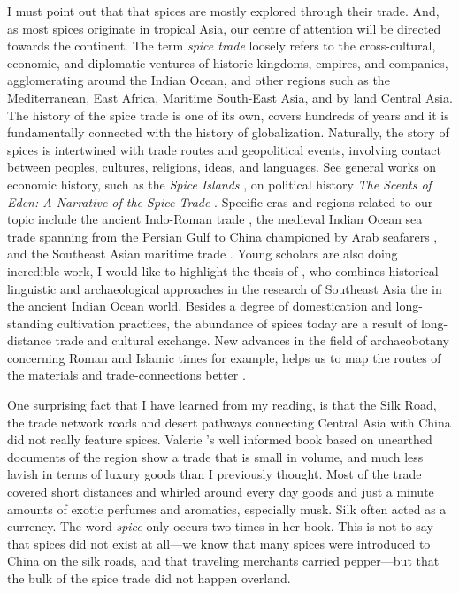 I must point out that that spices are mostly explored through their trade. And, as most spices originate in tropical Asia, our centre of attention will be directed towards the continent. The term \textit{spice trade} loosely refers to the cross-cultural, economic, and diplomatic ventures of historic kingdoms, empires, and companies, agglomerating around the Indian Ocean, and other regions such as the Mediterranean, East Africa, Maritime South-East Asia, and by land Central Asia. The history of the spice trade is one of its own, covers hundreds of years and it is fundamentally connected with the history of globalization. Naturally, the story of spices is intertwined with trade routes and geopolitical events, involving contact between peoples, cultures, religions, ideas, and languages. See general works on economic history, such as the \textit{Spice Islands} \autocite{burnet_spice_2011}, on political history \textit{The Scents of Eden: A Narrative of the Spice Trade} \autocite{corn_scents_1998}. Specific eras and regions related to our topic include the ancient Indo-Roman trade \autocite{sidebotham_berenike_2011,cobb_indian_2019}, the medieval Indian Ocean sea trade spanning from the Persian Gulf to China championed by Arab seafarers \autocite{hourani_arab_1975, pearson_spices_1996}, and the Southeast Asian maritime trade \autocite{donkin_between_2003,hall_history_2010,reid_southeast_1988}. Young scholars are also doing incredible work, I would like to highlight the thesis of \textcite{hoogervorst_southeast_2012}, who combines historical linguistic and archaeological approaches in the research of Southeast Asia the in the ancient Indian Ocean world. Besides a degree of domestication and long-standing cultivation practices, the abundance of spices today are a result of long-distance trade and cultural exchange. New advances in the field of archaeobotany concerning Roman and Islamic times for example, helps us to map the routes of the materials and trade-connections better \autocites[see][]{van_der_veen_roman_2015}{ van_der_veen_archaeobotany_2018}.

One surprising fact that I have learned from my reading, is that the Silk Road, the trade network roads and desert pathways connecting Central Asia with China did not really feature spices. Valerie \textcite{Hansen}'s well informed book based on unearthed documents of the region show a trade that is small in volume, and much less lavish in terms of luxury goods than I previously thought. Most of the trade covered short distances and whirled around every day goods and just a minute amounts of exotic perfumes and aromatics, especially musk. Silk often acted as a currency. The word \textit{spice} only occurs two times in her book. This is not to say that spices did not exist at all---we know that many spices were introduced to China on the silk roads, and that traveling merchants carried pepper---but that the bulk of the spice trade did not happen overland.

